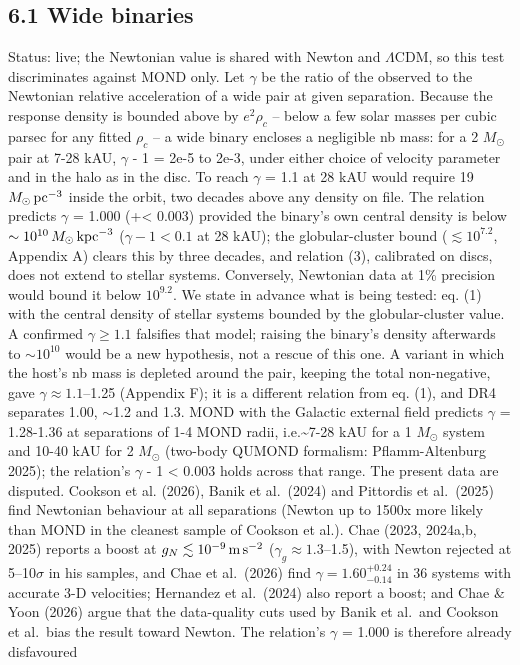 \documentclass[
  10pt,
]{article}
\begin{document}
\subsection{6.1 Wide binaries}

Status: live; the Newtonian value is shared with Newton and $\Lambda$CDM, so this test discriminates against MOND only. Let $\gamma$ be the ratio of the observed to the
Newtonian relative acceleration of a wide pair at given separation.
Because the response density is bounded above by $e^2\rho_c$ -- below
a few solar masses per cubic parsec for any fitted $\rho_c$ -- a wide
binary encloses a negligible nb mass: for a 2 $M_\odot$ pair at 7-28 kAU,
$\gamma$ - 1 = 2e-5 to 2e-3, under either choice of velocity parameter and
in the halo as in the disc. To reach $\gamma$ = 1.1 at 28 kAU would require
19 $M_\odot\,{\rm pc}^{-3}$ inside the orbit, two decades above any density on
file. The relation predicts $\gamma$ = 1.000 (+\textless{} 0.003) provided the binary's own central density is below $\sim10^{10}\,M_\odot\,{\rm kpc}^{-3}$ ($\gamma-1<0.1$ at 28 kAU); the globular-cluster bound ($\lesssim10^{7.2}$, Appendix A) clears this by three decades, and relation (3), calibrated on discs, does not extend to stellar systems. Conversely, Newtonian data at 1\% precision would bound it below $10^{9.2}$. We state in advance what is being tested: eq. (1) with the central density of stellar systems bounded by the globular-cluster value. A confirmed $\gamma\ge1.1$ falsifies that model; raising the binary's density afterwards to $\sim10^{10}$ would be a new hypothesis, not a rescue of this one. A variant in which the host's nb mass is depleted around the pair, keeping the total non-negative, gave $\gamma\approx1.1$--1.25 (Appendix F); it is a different relation from eq. (1), and DR4 separates 1.00, $\sim$1.2 and 1.3. MOND with the
Galactic external field predicts $\gamma$ = 1.28-1.36 at separations of 1-4
MOND radii, i.e.\textasciitilde{}7-28 kAU for a 1 $M_\odot$ system and 10-40 kAU for 2 $M_\odot$ (two-body QUMOND formalism: Pflamm-Altenburg
2025); the relation's $\gamma$ - 1 \textless{} 0.003 holds across that range.
The present data are disputed. Cookson et al. (2026), Banik et
al.~(2024) and Pittordis et al.~(2025) find Newtonian behaviour at all
separations (Newton up to 1500x more likely than MOND in the cleanest
sample of Cookson et al.). Chae (2023, 2024a,b, 2025) reports a boost at $g_N\lesssim10^{-9}\,{\rm m\,s^{-2}}$ ($\gamma_g\approx1.3$--1.5), with Newton rejected at 5--10$\sigma$ in his samples, and Chae et al.~(2026) find $\gamma=1.60^{+0.24}_{-0.14}$ in 36 systems with accurate 3-D velocities; Hernandez et al.~(2024) also report a boost; and Chae \& Yoon (2026) argue that the data-quality cuts used by Banik et al.~and Cookson et al.~bias the result toward Newton. The relation's $\gamma$ = 1.000 is therefore already disfavoured
\end{document}
